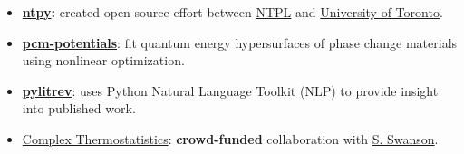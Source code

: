 \documentclass{article}
\begin{document}
\begin{itemize}[leftmargin=*]
\begin{itemize}[leftmargin=10pt,itemindent=10pt, noitemsep, topsep=1pt, parsep=1pt, partopsep=1pt]
  \item \textbf{\href{https://github.com/ntpl/ntpy}{ntpy}:} created open-source effort between \href{http://ntpl.me.cmu.edu/}{NTPL} and \href{http://www.mie.utoronto.ca/labs/atoms/}{University of Toronto}.







\item \textbf{\href{https://github.com/jasonlarkin/pcm-potentials}{pcm-potentials}}: fit quantum energy hypersurfaces of phase change materials using nonlinear optimization.

\item \textbf{\href{https://github.com/jasonlarkin/pylitrev}{pylitrev}}: uses Python Natural Language Toolkit (NLP) to provide insight into published work. 

\item \href{https://github.com/drProton/complex_thermo_src}{Complex Thermostatistics}: \textbf{crowd-funded} collaboration with \href{https://github.com/drProton}{S. Swanson}. 

\end{itemize}

\end{itemize}
\end{document}
